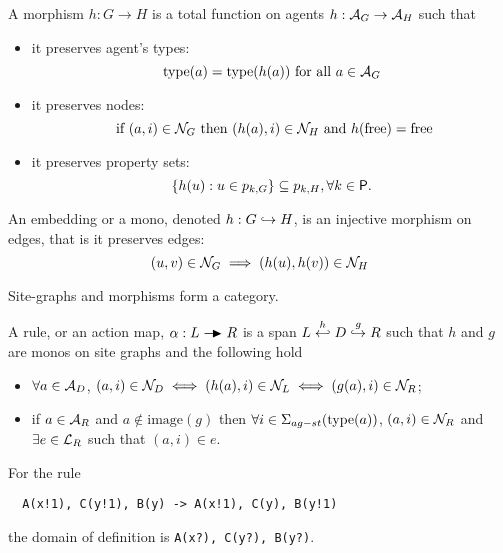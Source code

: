 \begin{definition}[Morphisms]
A morphism $h:G\to H$ is a total function on agents $h:\mathcal{A}_G\to\mathcal{A}_H$ such that
\begin{itemize}
\item it preserves agent's types:
\[
\operatorname{type}(a) = \operatorname{type}(h(a)) \text{ for all }a \in \mathcal{A}_G
\]
\item it preserves nodes:
\[
\text{ if }(a,i)\in \mathcal{N}_G \text{ then }(h(a),i) \in \mathcal{N}_H\text{ and }h(\text{free})=\text{free}
\]
\item it preserves property sets:
\[
\{h(u) : u\in p_{k,G}\} \subseteq p_{k,H}, \forall k\in\mathsf{P}.
\]
\end{itemize}
An embedding or a mono, denoted $h:G\hookrightarrow H$, is an injective morphism on edges, that is it preserves edges:
\[
(u,v)\in\mathcal{N}_G \implies (h(u),h(v))\in\mathcal{N}_H
\]
\end{definition}

\begin{lemma}
  Site-graphs and morphisms form a category.
\end{lemma}


\begin{definition}[Rules]
  A rule, or an action map, $\alpha:L \action R$ is a span $L\overset{h}{\hookleftarrow} D \overset{g}{\hookrightarrow} R$ such that $h$ and $g$ are monos on site graphs and the following hold
  \begin{itemize}
  \item $\forall a\in\mathcal{A}_D$, $(a,i)\in\mathcal{N}_D\iff (h(a),i)\in\mathcal{N}_L \iff (g(a),i)\in\mathcal{N}_R$;
  \item if $a\in\mathcal{A}_R$ and $a\notin\text{image}(g)$ then $\forall i\in\Sigma_{ag-st}(\operatorname{type}(a))$, $(a,i)\in\mathcal{N}_R$ and $\exists e\in \mathcal{L}_R$ such that $(a,i)\in e$.
  \end{itemize}
\end{definition}

\begin{example}
For the rule
\begin{verbatim}
  A(x!1), C(y!1), B(y) -> A(x!1), C(y), B(y!1)
\end{verbatim}
the domain of definition is \verb|A(x?), C(y?), B(y?)|.
\end{example}

